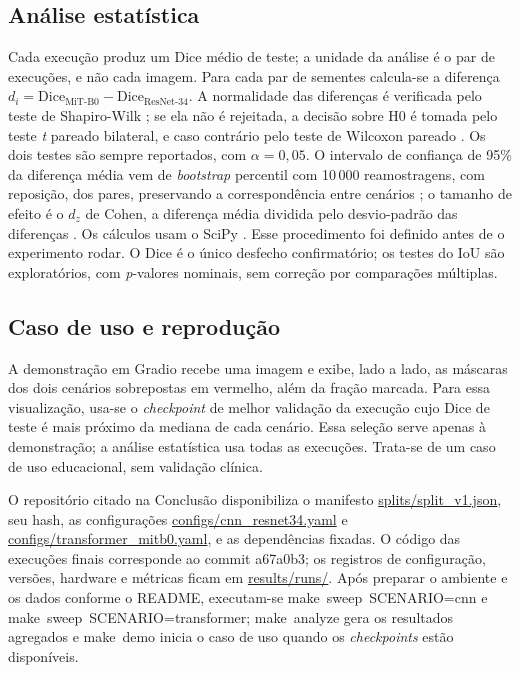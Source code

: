 \documentclass[conference]{IEEEtran}
\begin{document}
\subsection{Análise estatística}
Cada execução produz um Dice médio de teste; a unidade da análise é o par de execuções,
e não cada imagem. Para cada par de sementes calcula-se a diferença $d_i = \text{Dice}_{\text{MiT-B0}} -
\text{Dice}_{\text{ResNet-34}}$. A normalidade das diferenças é verificada pelo teste de
Shapiro-Wilk \cite{shapiro1965normality}; se ela não é rejeitada, a decisão sobre H0 é tomada
pelo teste \textit{t} pareado bilateral, e caso contrário pelo teste de Wilcoxon pareado
\cite{wilcoxon1945ranking}. Os dois testes são sempre reportados, com $\alpha = 0{,}05$. O
intervalo de confiança de 95\% da diferença média vem de \textit{bootstrap} percentil com 10\,000
reamostragens, com reposição, dos \NPairs{} pares, preservando a correspondência entre
cenários \cite{efron1979bootstrap}; o tamanho de efeito é o $d_z$ de Cohen, a diferença
média dividida pelo desvio-padrão das diferenças \cite{lakens2013effect}. Os cálculos usam o
SciPy \cite{virtanen2020scipy}. Esse procedimento foi definido antes de o experimento rodar.
O Dice é o único desfecho confirmatório; os testes do IoU são exploratórios, com
\textit{p}-valores nominais, sem correção por comparações múltiplas.

\subsection{Caso de uso e reprodução}
A demonstração em Gradio recebe uma imagem e exibe, lado a lado, as máscaras dos dois
cenários sobrepostas em vermelho, além da fração marcada. Para essa visualização,
usa-se o \textit{checkpoint} de melhor validação da execução cujo Dice de teste é mais
próximo da mediana de cada cenário. Essa seleção serve apenas à demonstração; a análise
estatística usa todas as execuções. Trata-se de um caso de uso educacional, sem validação clínica.

O repositório citado na Conclusão disponibiliza o manifesto
\url{splits/split_v1.json}, seu hash, as configurações
\url{configs/cnn_resnet34.yaml} e \url{configs/transformer_mitb0.yaml}, e as dependências
fixadas. O código das execuções finais corresponde ao commit a67a0b3; os registros
de configuração, versões, hardware e métricas ficam em \url{results/runs/}.
Após preparar o ambiente e os dados conforme o README, executam-se
\mbox{make sweep SCENARIO=cnn} e \mbox{make sweep SCENARIO=transformer};
\mbox{make analyze} gera os resultados agregados e \mbox{make demo} inicia o caso de uso
quando os \textit{checkpoints} estão disponíveis.
\end{document}
